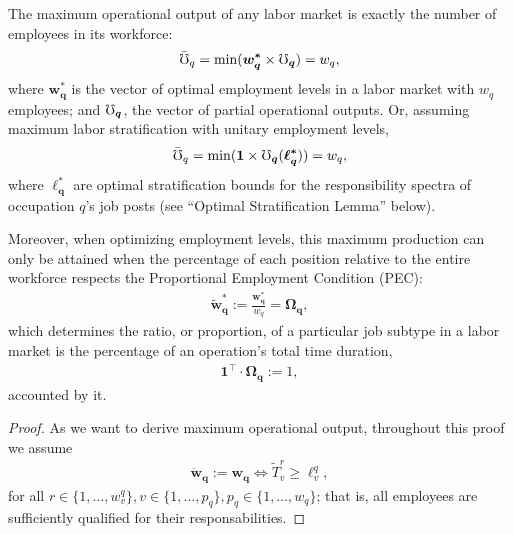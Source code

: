\documentclass[hidelinks, nonatbib]{elsarticle}
\begin{document}
\begin{lemma}
    The maximum operational output of any labor market is exactly the number of employees in its workforce:
    \begin{gather}
        \bar{\mho}_{q}
        =
        \min(
            \boldsymbol{w_{q}^{*}}
            \times
            \boldsymbol{\mho_q}
        )
        = w_q
        ,
    \end{gather}
    where $\boldsymbol{w_{q}^{*}}$ is the vector of optimal employment levels in a labor market with $w_q$ employees; and $\boldsymbol{\mho_q}$, the vector of partial operational outputs. Or, assuming maximum labor stratification with unitary employment levels,
    \begin{gather}
        \bar{\mho}_{q}
        =
        \min(
            \boldsymbol{1}
            \times
            \boldsymbol{\mho_q}(
                \boldsymbol{\ell_{q}^{*}}
            )
        )
        = w_q
        ,
    \end{gather}
    where $\boldsymbol{\ell_{q}^{*}}$ are optimal stratification bounds for the responsibility spectra of occupation $q$'s job posts (see ``Optimal Stratification Lemma'' below).
    
    Moreover, when optimizing employment levels, this maximum production can only be attained when the percentage of each position relative to the entire workforce respects the Proportional Employment Condition (PEC):
    \begin{gather}
        \boldsymbol{\tilde{w}_{q}^{*}}
        :=
        \frac{
            \boldsymbol{w_{q}^{*}}
        }{
            w_q
        }
        =
        \boldsymbol{\Omega_{q}}
        ,
    \end{gather}
    which determines the ratio, or proportion, of a particular job subtype in a labor market is the percentage of an operation's total time duration,
    \begin{gather}
        \boldsymbol{1} ^ {\top}
        \cdot
        \boldsymbol{\Omega_{q}}
        := 1
        ,
    \end{gather}
    accounted by it.
    
    \begin{proof}
        As we want to derive maximum operational output, throughout this proof we assume
        \begin{gather}
            \boldsymbol{\ddot{w}_{q}}
            :=
            \boldsymbol{w_q}
            \iff
            \tilde{T}_{v}^{r}
            \geq
            \ell_{v}^{q}
            ,
        \end{gather}
        for all $
        r \in \{1, \dots, w_{v}^{q}\}
        ,
        v \in \{1, \dots, p_q\}
        ,
        p_q \in \{1, \dots, w_q\}
        $; that is, all employees are sufficiently qualified for their responsabilities.
        

\end{proof}
\end{lemma}
\end{document}
